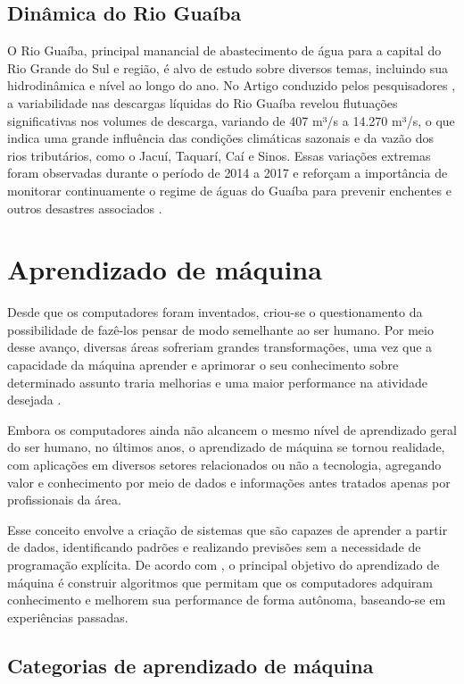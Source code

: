 \subsection{Dinâmica do Rio Guaíba}

O Rio Guaíba, principal manancial de abastecimento de água para a capital do Rio Grande do Sul e região, é alvo de estudo sobre diversos temas, incluindo sua hidrodinâmica e nível ao longo do ano. No Artigo conduzido pelos pesquisadores \cite{andrade2017}, a variabilidade nas descargas líquidas do Rio Guaíba revelou flutuações significativas nos volumes de descarga, variando de 407 m³/s a 14.270 m³/s, o que indica uma grande influência das condições climáticas sazonais e da vazão dos rios tributários, como o Jacuí, Taquarí, Caí e Sinos. Essas variações extremas foram observadas durante o período de 2014 a 2017 e reforçam a importância de monitorar continuamente o regime de águas do Guaíba para prevenir enchentes e outros desastres associados \cite{andrade2017}.

\section{Aprendizado de máquina}

Desde que os computadores foram inventados, criou-se o questionamento da possibilidade de fazê-los pensar de modo semelhante ao ser humano. Por meio desse avanço, diversas áreas sofreriam grandes transformações, uma vez que a capacidade da máquina aprender e aprimorar o seu conhecimento sobre determinado assunto traria melhorias e uma maior performance na atividade desejada \cite{carbonell1983}.

Embora os computadores ainda não alcancem o mesmo nível de aprendizado geral do ser humano, no últimos anos, o aprendizado de máquina se tornou realidade, com aplicações em diversos setores relacionados ou não a tecnologia, agregando valor e conhecimento por meio de dados e informações antes tratados apenas por profissionais da área.

Esse conceito envolve a criação de sistemas que são capazes de aprender a partir de dados, identificando padrões e realizando previsões sem a necessidade de programação explícita. De acordo com \cite{carbonell1983}, o principal objetivo do aprendizado de máquina é construir algoritmos que permitam que os computadores adquiram conhecimento e melhorem sua performance de forma autônoma, baseando-se em experiências passadas.

\subsection{Categorias de aprendizado de máquina}

